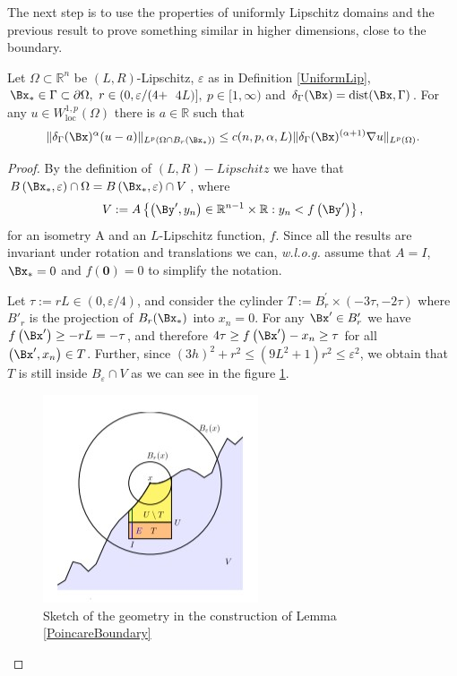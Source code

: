 The next step is to use the properties of uniformly Lipschitz domains and the previous result to prove something similar in higher dimensions, close to the boundary.

\begin{lemma}\label{PoincareBoundary}
     Let $\Omega \subset \mathbb{R}^n$ be $(L, R)$-Lipschitz, $\varepsilon$ as in Definition \ref{UniformLip}, $\Bx_* \in \GG\subset\dOm,\ r \in(0, \varepsilon /(4+$ $4 L)],\ p \in[1, \infty)$ and $\delta_\GG(\Bx)=\operatorname{dist}(\Bx, \GG)$. For any $u \in W_{\mathrm{loc}}^{1, p}(\Omega)$ there is $a \in \mathbb{R}$ such that
$$
\|\delta_\GG(\Bx)^\Ga (u-a)\|_{L^p(\Omega\cap B_r(\Bx_*))} \leq c(n,p,\Ga,L) \|\delta_\GG(\Bx)^{(\alpha+1)}\nabla u\|_{L^p(\Omega)}.
$$
\end{lemma}

\begin{proof}
    By the definition of $(L,R)-Lipschitz$ we have that $B\left(\Bx_*,\varepsilon\right) \cap \Omega=B\left(\Bx_*,\varepsilon\right) \cap V$, where 
$$
V:=A\left\{\left(\By^{\prime}, y_n\right) \in \mathbb{R}^{n-1} \times \mathbb{R}: y_n<f\left(\By^{\prime}\right)\right\},
$$ 
for an isometry  A  and an $L$-Lipschitz  function, $f$. Since all the results are invariant under rotation and translations we can, \textit{w.l.o.g.} assume that $A=I$, $\Bx_*=0$ and $f(\mathbf{0})=0$ to simplify the notation.

Let $\tau:= r L \in(0, \varepsilon / 4)$,  and consider the cylinder $T:=B_r^{\prime} \times(-3 \tau,-2 \tau)$ where $B'_r$ is the projection of $B_r(\Bx_*)$ into $x_n = 0$. For any $\Bx^{\prime} \in B_r^{\prime}$ we have $f\left(\Bx^{\prime}\right) \geq-r L=-\tau$, and therefore $4\tau\geq f\left(\Bx^{\prime}\right)-x_n \geq \tau$ for all $\left(\Bx^{\prime}, x_n\right) \in T$. Further, since $(3 h)^2+r^2 \leq (9L^2+1)r^2\leq \varepsilon^2$, we obtain that $T$  is still inside  $B_{\varepsilon} \cap V$ as we can see in the figure \ref{fig:wK}. 
\begin{figure}[!h]
    \centering
    \includegraphics[scale = 2]{figures/wKornImage.jpg}
    \caption{Sketch of the geometry in the construction of Lemma \ref{PoincareBoundary}}
    \label{fig:wK}
\end{figure}


\end{proof}
